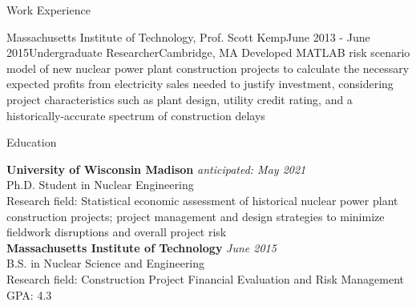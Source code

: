 \documentclass{resume} %
\begin{document}
\begin{rSection}{Work Experience}

\begin{rSubsection}{Massachusetts Institute of Technology, Prof. Scott Kemp}{June 2013 - June 2015}{Undergraduate Researcher}{Cambridge, MA}
Developed MATLAB risk scenario model of new nuclear power plant construction projects to calculate the necessary expected profits from electricity sales needed to justify investment, considering project characteristics such as plant design, utility credit rating, and a historically-accurate spectrum of construction delays
\end{rSubsection}

\end{rSection}



\begin{rSection}{Education}

{\bf University of Wisconsin Madison} \hfill {\em anticipated: May 2021} \\
Ph.D. Student in Nuclear Engineering \\
Research field: Statistical economic assessment of historical nuclear power plant construction projects; project management and design strategies to minimize fieldwork disruptions and overall project risk
\\

{\bf Massachusetts Institute of Technology} \hfill {\em June 2015} \\ 
B.S. in Nuclear Science and Engineering \\
Research field: Construction Project Financial Evaluation and Risk Management \smallskip \\
GPA: 4.3

\end{rSection}





\end{document}
